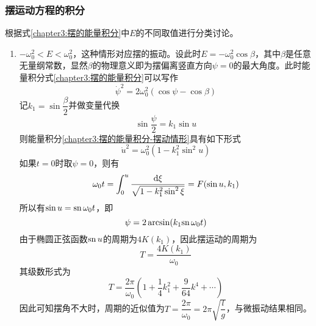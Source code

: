 \subsubsection{摆运动方程的积分}\label{chapter3:subsubsection-摆运动方程的积分}

根据式\eqref{chapter3:摆的能量积分}中$E$的不同取值进行分类讨论。
\begin{enumerate}
\item $-\omega_0^2<E<\omega_0^2$，这种情形对应摆的振动。设此时$E=-\omega_0^2\cos\beta$，其中$\beta$是任意无量纲常数，显然$\beta$的物理意义即为摆偏离竖直方向$\psi=0$的最大角度。此时能量积分式\eqref{chapter3:摆的能量积分}可以写作
\begin{equation}
	\dot{\psi}^2 = 2\omega_0^2(\cos\psi-\cos\beta)
	\label{chapter3:摆的能量积分-摆动情形}
\end{equation}
记$k_1=\sin\dfrac{\beta}{2}$并做变量代换
\begin{equation*}
	\sin\dfrac{\psi}{2}=k_1\sin u
\end{equation*}
则能量积分\eqref{chapter3:摆的能量积分-摆动情形}具有如下形式
\begin{equation}
	\dot{u}^2 = \omega_0^2(1-k_1^2\sin^2u)
\end{equation}
如果$t=0$时取$\psi=0$，则有
\begin{equation}
	\omega_0t = \int_0^u \frac{\mathrm{d} \xi}{\sqrt{1-k_1^2\sin^2\xi}} = F(\sin u,k_1)
\end{equation}
所以有$\sin u = \mathrm{sn}\, \omega_0t$，即
\begin{equation}
	\psi = 2\arcsin(k_1\mathrm{sn}\, \omega_0t)
\end{equation}
由于椭圆正弦函数$\mathrm{sn}\, u$的周期为$4K(k_1)$，因此摆运动的周期为
\begin{equation}
	T = \frac{4K(k_1)}{\omega_0}
\end{equation}
其级数形式为
\begin{equation}
	T = \frac{2\pi}{\omega_0}\left(1+\frac14k_1^2+\frac{9}{64}k^4+\cdots\right)
\end{equation}
因此可知摆角不大时，周期的近似值为$T=\dfrac{2\pi}{\omega_0}=2\pi\sqrt{\dfrac lg}$，与微振动结果相同。


\end{enumerate}
